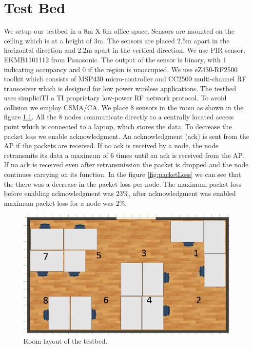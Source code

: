 \chapter{Test Bed}
\label{chp:testbed}

We setup our testbed in a 8m X 6m office space. Sensors are mounted on the ceiling which is at a height of 3m. The sensors are  placed 2.5m apart in the horizontal direction and 2.2m apart in the vertical direction. We use  PIR sensor, EKMB1101112 from Panasonic. 
The output of the sensor is binary, with 1 indicating occupancy and 0 if the region is unoccupied.  We use eZ430-RF2500 toolkit which consists of MSP430 micro-controller  and CC2500 multi-channel
RF transceiver which is designed for low power wireless applications. The testbed uses simpliciTI a TI proprietary  low-power RF network protocol. To avoid collision we employ CSMA/CA. We place 8 sensors in the room as shown in the figure \ref{fig:roomLayout}. All the 8 nodes communicate directly to a centrally located access point which is connected to a laptop, which stores the data.
To decrease the packet loss we enable acknowledgment. An acknowledgment (ack) is sent from the AP if the packets are received. If no ack is received by a node, the node retransmits its data a maximum of 6 times until an ack is  received from the AP. If no ack is received even after retransmission the packet is dropped and the node continues carrying on its function. In the figure \ref{fig:packetLoss} we can see that the there was a decrease in the packet loss per node. The maximum packet loss before enabling acknowledgment was 23\%, after acknowledgment was enabled maximum packet loss for a node was 2\%.

\begin{figure}
\centering
\includegraphics[scale=0.5]{./pics/roomLayout.png}
\caption{Room layout of the testbed.}
\label{fig:roomLayout}
\end{figure}

